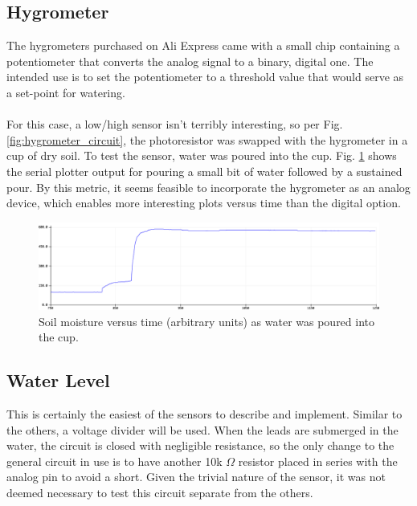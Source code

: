 \documentclass[]{article}
\begin{document}
\subsection{Hygrometer}
The hygrometers purchased on Ali Express came with a small chip containing a potentiometer that converts the analog signal to a binary, digital one.  The intended use is to set the potentiometer to a threshold value that would serve as a set-point for watering.  
\\\\
For this case, a low/high sensor isn't terribly interesting, so per Fig. \ref{fig:hygrometer_circuit}, the photoresistor was swapped with the hygrometer in a cup of dry soil.  To test the sensor, water was poured into the cup.  Fig. \ref{fig:moisture_plot} shows the serial plotter output for pouring a small bit of water followed by a sustained pour.  By this metric, it seems feasible to incorporate the hygrometer as an analog device, which enables more interesting plots versus time than the digital option.
\begin{figure}[h]
	\centering
	\includegraphics[width=\textwidth]{moisture_plot}
	\caption{Soil moisture versus time (arbitrary units) as water was poured into the cup.}
	\label{fig:moisture_plot}
\end{figure}

\subsection{Water Level}
This is certainly the easiest of the sensors to describe and implement.  Similar to the others, a voltage divider will be used.  When the leads are submerged in the water, the circuit is closed with negligible resistance, so the only change to the general circuit in use is to have another 10k $\Omega$ resistor placed in series with the analog pin to avoid a short.  Given the trivial nature of the sensor, it was not deemed necessary to test this circuit separate from the others.

\newpage
\end{document}
